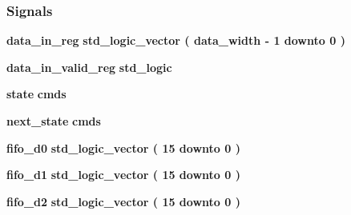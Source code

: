 \subsubsection*{Signals}
 \begin{DoxyCompactItemize}
\item 
{\bf data\+\_\+in\+\_\+reg} {\bfseries \textcolor{comment}{std\+\_\+logic\+\_\+vector}\textcolor{vhdlchar}{ }\textcolor{vhdlchar}{(}\textcolor{vhdlchar}{ }\textcolor{vhdlchar}{ }\textcolor{vhdlchar}{ }\textcolor{vhdlchar}{ }{\bfseries {\bf data\+\_\+width}} \textcolor{vhdlchar}{-\/}\textcolor{vhdlchar}{ } \textcolor{vhdldigit}{1} \textcolor{vhdlchar}{ }\textcolor{keywordflow}{downto}\textcolor{vhdlchar}{ }\textcolor{vhdlchar}{ } \textcolor{vhdldigit}{0} \textcolor{vhdlchar}{ }\textcolor{vhdlchar}{)}\textcolor{vhdlchar}{ }} 
\item 
{\bf data\+\_\+in\+\_\+valid\+\_\+reg} {\bfseries \textcolor{comment}{std\+\_\+logic}\textcolor{vhdlchar}{ }} 
\item 
{\bf state} {\bfseries {\bfseries {\bf cmds}} \textcolor{vhdlchar}{ }} 
\item 
{\bf next\+\_\+state} {\bfseries {\bfseries {\bf cmds}} \textcolor{vhdlchar}{ }} 
\item 
{\bf fifo\+\_\+d0} {\bfseries \textcolor{comment}{std\+\_\+logic\+\_\+vector}\textcolor{vhdlchar}{ }\textcolor{vhdlchar}{(}\textcolor{vhdlchar}{ }\textcolor{vhdlchar}{ } \textcolor{vhdldigit}{15} \textcolor{vhdlchar}{ }\textcolor{keywordflow}{downto}\textcolor{vhdlchar}{ }\textcolor{vhdlchar}{ } \textcolor{vhdldigit}{0} \textcolor{vhdlchar}{ }\textcolor{vhdlchar}{)}\textcolor{vhdlchar}{ }} 
\item 
{\bf fifo\+\_\+d1} {\bfseries \textcolor{comment}{std\+\_\+logic\+\_\+vector}\textcolor{vhdlchar}{ }\textcolor{vhdlchar}{(}\textcolor{vhdlchar}{ }\textcolor{vhdlchar}{ } \textcolor{vhdldigit}{15} \textcolor{vhdlchar}{ }\textcolor{keywordflow}{downto}\textcolor{vhdlchar}{ }\textcolor{vhdlchar}{ } \textcolor{vhdldigit}{0} \textcolor{vhdlchar}{ }\textcolor{vhdlchar}{)}\textcolor{vhdlchar}{ }} 
\item 
{\bf fifo\+\_\+d2} {\bfseries \textcolor{comment}{std\+\_\+logic\+\_\+vector}\textcolor{vhdlchar}{ }\textcolor{vhdlchar}{(}\textcolor{vhdlchar}{ }\textcolor{vhdlchar}{ } \textcolor{vhdldigit}{15} \textcolor{vhdlchar}{ }\textcolor{keywordflow}{downto}\textcolor{vhdlchar}{ }\textcolor{vhdlchar}{ } \textcolor{vhdldigit}{0} \textcolor{vhdlchar}{ }\textcolor{vhdlchar}{)}\textcolor{vhdlchar}{ }} 
\item 

\end{DoxyCompactItemize}
